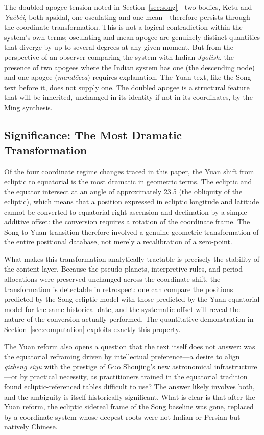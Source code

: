\documentclass[10pt,a4paper]{article}
\begin{document}
The doubled-apogee tension noted in Section~\ref{sec:song}---two
bodies, Ketu and \textit{Yu\`eb\`ei}, both apsidal, one osculating and
one mean---therefore persists through the coordinate transformation.
This is not a logical contradiction within the system's own terms;
osculating and mean apogee are genuinely distinct quantities that
diverge by up to several degrees at any given moment.  But
from the perspective of an observer comparing the system with
Indian \textit{Jyotish}, the presence of two apogees where the
Indian system has one (the descending node) and one apogee
(\textit{mand\={o}cca}) requires explanation.  The Yuan text,
like the Song text before it, does not supply one.  The doubled
apogee is a structural feature that will be inherited, unchanged
in its identity if not in its coordinates, by the Ming synthesis.

\subsection*{Significance: The Most Dramatic Transformation}

Of the four coordinate regime changes traced in this paper, the
Yuan shift from ecliptic to equatorial is the most dramatic in
geometric terms.  The ecliptic and the equator intersect at an
angle of approximately 23.5\textdegree{} (the obliquity of the
ecliptic), which means that a position expressed in ecliptic
longitude and latitude cannot be converted to equatorial right
ascension and declination by a simple additive offset: the
conversion requires a rotation of the coordinate frame.  The
Song-to-Yuan transition therefore involved a genuine geometric
transformation of the entire positional database, not merely a
recalibration of a zero-point.

What makes this transformation analytically tractable is precisely
the stability of the content layer.  Because the pseudo-planets,
interpretive rules, and period allocations were preserved unchanged
across the coordinate shift, the transformation is detectable in
retrospect: one can compare the positions predicted by the Song
ecliptic model with those predicted by the Yuan equatorial model
for the same historical date, and the systematic offset will reveal
the nature of the conversion actually performed.  The quantitative
demonstration in Section~\ref{sec:computation} exploits exactly
this property.

The Yuan reform also opens a question that the text itself does
not answer: was the equatorial reframing driven by intellectual
preference---a desire to align \textit{qizheng siyu} with the prestige
of Guo Shoujing's new astronomical infrastructure---or by
practical necessity, as practitioners trained in the equatorial
tradition found ecliptic-referenced tables difficult to use?
The answer likely involves both, and the ambiguity is itself
historically significant.  What is clear is that after the Yuan
reform, the ecliptic sidereal frame of the Song baseline was
gone, replaced by a coordinate system whose deepest roots were
not Indian or Persian but natively Chinese.
\end{document}
